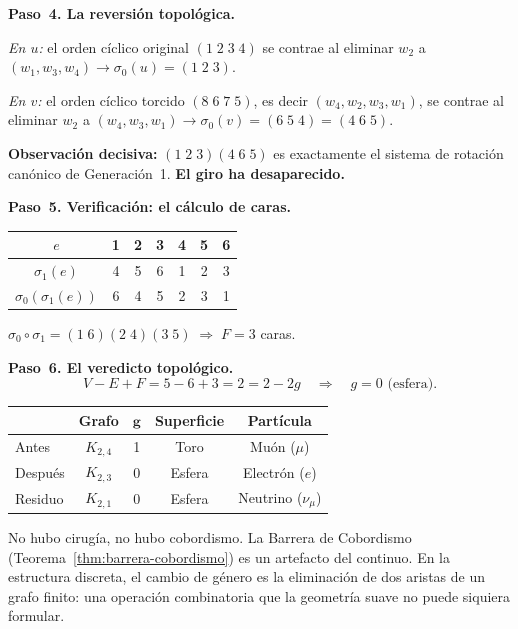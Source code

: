\documentclass[11pt, a4paper, openany]{book}
\begin{document}
\bigskip
\noindent
\textbf{Paso~4. La reversi\'on topol\'ogica.}

\textit{En $u$:} el orden c\'iclico original $(1\;2\;3\;4)$ se contrae
al eliminar $w_2$ a $(w_1, w_3, w_4) \longrightarrow \sigma_0(u) = (1\;2\;3)$.

\textit{En $v$:} el orden c\'iclico torcido $(8\;6\;7\;5)$, es decir
$(w_4, w_2, w_3, w_1)$, se contrae al eliminar $w_2$ a
$(w_4, w_3, w_1) \longrightarrow \sigma_0(v) = (6\;5\;4)=(4\;6\;5)$.

\textbf{Observaci\'on decisiva:} $(1\;2\;3)(4\;6\;5)$ es exactamente el
sistema de rotaci\'on can\'onico de Generaci\'on~1. \textbf{El giro ha
desaparecido.}

\bigskip
\noindent
\textbf{Paso~5. Verificaci\'on: el c\'alculo de caras.}

\begin{center}
\renewcommand{\arraystretch}{1.15}
\begin{tabular}{c@{\;\;}c@{\;\;}c@{\;\;}c@{\;\;}c@{\;\;}c@{\;\;}c}
\toprule
$e$ & 1 & 2 & 3 & 4 & 5 & 6 \\
\midrule
$\sigma_1(e)$ & 4 & 5 & 6 & 1 & 2 & 3 \\
$\sigma_0(\sigma_1(e))$ & 6 & 4 & 5 & 2 & 3 & 1 \\
\bottomrule
\end{tabular}
\end{center}
$\sigma_0 \circ \sigma_1 = (1\;6)(2\;4)(3\;5) \;\Longrightarrow\; F = 3$
caras.

\bigskip
\noindent
\textbf{Paso~6. El veredicto topol\'ogico.}
\[
  V - E + F = 5 - 6 + 3 = 2 = 2 - 2g
  \quad\Longrightarrow\quad \boxed{g = 0}\text{ (esfera).}
  \tag{$\mu$-II}
\]

\begin{result}[title={Balance de la desintegraci\'on}]
\begin{center}
\renewcommand{\arraystretch}{1.2}
\begin{tabular}{lcccc}
\toprule
& \textbf{Grafo} & $\boldsymbol{g}$ & \textbf{Superficie}
  & \textbf{Part\'icula} \\
\midrule
Antes   & $K_{2,4}$ & 1 & Toro   & Mu\'on ($\mu$) \\
Despu\'es & $K_{2,3}$ & 0 & Esfera & Electr\'on ($e$) \\
Residuo & $K_{2,1}$ & 0 & Esfera & Neutrino ($\nu_\mu$) \\
\bottomrule
\end{tabular}
\end{center}
No hubo cirug\'ia, no hubo cobordismo. La Barrera de Cobordismo
(Teorema~\ref{thm:barrera-cobordismo}) es un artefacto del continuo. En
la estructura discreta, el cambio de g\'enero es la eliminaci\'on de dos
aristas de un grafo finito: una operaci\'on combinatoria que la
geometr\'ia suave no puede siquiera formular.
\end{result}
\end{document}
